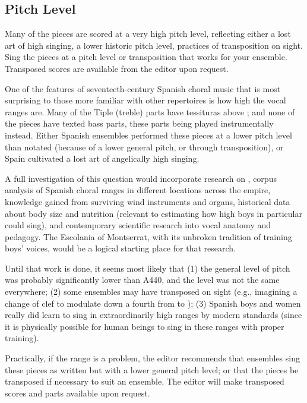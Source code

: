 \subsection*{Pitch Level}

\begin{epitome}
    Many of the pieces are scored at a very high pitch level, reflecting either
    a lost art of high singing, a lower historic pitch level, practices of
    transposition on sight.
    Sing the pieces at a pitch level or transposition that works for your
    ensemble.
    Transposed scores are available from the editor upon request.
\end{epitome}

One of the features of seventeeth-century Spanish choral music that is most
surprising to those more familiar with other repertoires is how high the vocal
ranges are.
Many of the Tiple (treble) parts have tessituras above ; and none of
the pieces have texted bass parts, these parts being played instrumentally
instead.
Either Spanish ensembles performed these pieces at a lower pitch level than
notated (because of a lower general pitch, or through transposition), or Spain
cultivated a lost art of angelically high singing.

A full investigation of this question would incorporate research on
, corpus analysis of Spanish choral ranges in different
locations across the empire, knowledge gained from surviving wind instruments
and organs, historical data about body size and nutrition (relevant to
estimating how high boys in particular could sing), and contemporary scientific
research into vocal anatomy and pedagogy.
The Escolania of Montserrat, with its unbroken tradition of training boys'
voices, would be a logical starting place for that research.

Until that work is done, it seems most likely that (1) the general level of
pitch was probably significantly lower than A440, and the level was not the same
everywhere; (2) some ensembles may have transposed on sight (e.g., imagining a
change of clef to modulate down a fourth from  to
); (3) Spanish boys and women really did learn to sing
in extraordinarily high ranges by modern standards (since it is physically
possible for human beings to sing in these ranges with proper training).

Practically, if the range is a problem, the editor recommends that ensembles
sing these pieces as written but with a lower general pitch level; or that the
pieces be transposed if necessary to suit an ensemble.
The editor will make transposed scores and parts available upon request.



